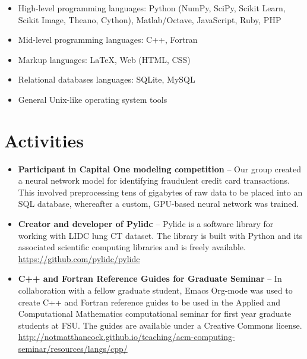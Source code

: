 \documentclass[a4paper,10pt]{report}
\begin{document}
{\begin{itemize} \item High-level programming languages: Python (NumPy, SciPy, Scikit Learn, Scikit Image, Theano, Cython), Matlab/Octave, JavaScript, Ruby, PHP\end{itemize}}{\begin{itemize} \item Mid-level programming languages: C++, Fortran\end{itemize}}{\begin{itemize} \item Markup languages: \LaTeX, Web (HTML, CSS)\end{itemize}}{\begin{itemize} \item Relational databases languages: SQLite, MySQL\end{itemize}}{\begin{itemize} \item General Unix-like operating system tools\end{itemize}}

\section{Activities}

{\begin{itemize} \item {\bf Participant in Capital One modeling competition} -- Our group created a neural network model for identifying fraudulent credit card transactions. This involved preprocessing tens of gigabytes of raw data to be placed into an SQL database, whereafter a custom, GPU-based neural network was trained.\end{itemize}}{\begin{itemize} \item {\bf Creator and developer of Pylidc} -- Pylidc is a software library for working with LIDC lung CT dataset. The library is built with Python and its associated scientific computing libraries and is freely available. \url{https://github.com/pylidc/pylidc}\end{itemize}}{\begin{itemize} \item {\bf C++ and Fortran Reference Guides for Graduate Seminar} -- In collaboration with a fellow graduate student, Emacs Org-mode was used to create C++ and Fortran reference guides to be used in the Applied and Computational Mathematics computational seminar for first year graduate students at FSU. The guides are available under a Creative Commons license. \url{http://notmatthancock.github.io/teaching/acm-computing-seminar/resources/langs/cpp/}\end{itemize}}
\end{document}
